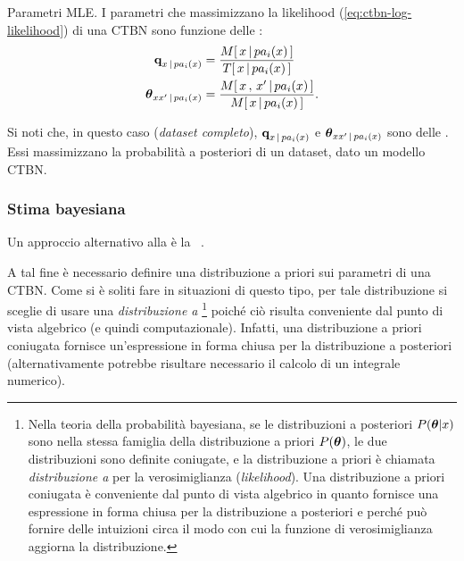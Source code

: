 \begin{teorema}{Parametri \ac{MLE}.}
    I parametri che massimizzano la likelihood (\autoref{eq:ctbn-log-likelihood}) di una \acl{CTBN} sono funzione delle \keyword{\stats{}}:
    \begin{equation}
        \label{eq:ctbn-params}
        \normalfont
        \begin{split}
        \param{q}_{\setel{x}\,\arrowvert\,pa_i(\setel{x})}&=\frac{\mstat{x\,\arrowvert\,pa_i(\setel{x})}}{\tstat{\setel{x}\,\arrowvert\,pa_i(\setel{x})}} \\
        \param{$\theta$}_{\setel{x}\setel{x}^\prime\,\arrowvert\,pa_i(\setel{x})}&=\frac{\mstat[x]{\setel{x}^\prime\,\arrowvert\,pa_i(\setel{x})}}{\mstat{\setel{x}\,\arrowvert\,pa_i(\setel{x})}}\text{.}
        \end{split}
        \end{equation}
\end{teorema}
\normalfont
Si noti che, in questo caso (\emph{dataset completo}), $\boldsymbol{\textbf{\text{q}}}_{\mathnormal{x}\,\arrowvert\,pa_i(\mathnormal{x})}$ e $\boldsymbol{\textbf{\text{$\theta$}}}_{\mathnormal{x}\mathnormal{x}^\prime\,\arrowvert\,pa_i(\mathnormal{x})}$ sono delle \emph{}. Essi massimizzano la probabilità a posteriori di un dataset, dato un modello \acs{CTBN}.

\subsubsection{Stima bayesiana}
\label{subsec:ctbn-bayesian-estimate}
Un approccio alternativo alla  è la ~\citep[si veda][sottosezione 5.1.1]{Nodelman2007}.

A tal fine è necessario definire una distribuzione a priori sui parametri di una \acs{CTBN}. Come si è soliti fare in situazioni di questo tipo, per tale distribuzione si sceglie di usare una \emph{distribuzione a }\footnote{\label{note:conjugate-prior}Nella teoria della probabilità bayesiana, se le distribuzioni a posteriori $P(\boldsymbol{\textbf{\text{$\theta$}}}|\mathnormal{x})$ sono nella stessa famiglia della distribuzione a priori $P(\boldsymbol{\textbf{\text{$\theta$}}})$, le due distribuzioni sono definite coniugate, e la distribuzione a priori è chiamata \emph{distribuzione a } per la verosimiglianza (\emph{likelihood}). Una distribuzione a priori coniugata è conveniente dal punto di vista algebrico in quanto fornisce una espressione in forma chiusa per la distribuzione a posteriori e perché può fornire delle intuizioni circa il modo con cui la funzione di verosimiglianza aggiorna la distribuzione.} poiché ciò risulta conveniente dal punto di vista algebrico (e quindi computazionale). Infatti, una distribuzione a priori coniugata fornisce un'espressione in forma chiusa per la distribuzione a posteriori (alternativamente potrebbe risultare necessario il calcolo di un integrale numerico).

